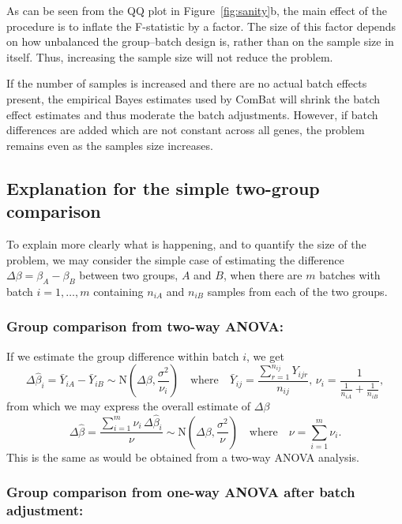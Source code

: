 \documentclass{bio}
\begin{document}
As can be seen from the QQ plot in Figure~\ref{fig:sanity}b, the main effect of the procedure is to inflate the F-statistic by a factor. The size of this factor depends on how unbalanced the group--batch design is, rather than on the sample size in itself. Thus, increasing the sample size will not reduce the problem.

If the number of samples is increased and there are no actual batch effects present, the empirical Bayes estimates used by ComBat will shrink the batch effect estimates and thus moderate the batch adjustments. However, if batch differences are added which are not constant across all genes, the problem remains even as the samples size increases.

\subsection{Explanation for the simple two-group comparison}
\label{sec:twogroups}

To explain more clearly what is happening, and to quantify the size of the problem, we may consider the simple case of estimating the difference $\Delta\beta=\beta_A-\beta_B$ between two groups, $A$ and $B$, when there are $m$ batches with batch $i=1,\ldots,m$ containing $n_{iA}$ and $n_{iB}$ samples from each of the two groups.

\subsubsection{Group comparison from two-way ANOVA:}

If we estimate the group difference within batch $i$, we get
\begin{equation}
\Delta\hat{\beta}_i=\bar{Y}_{iA}-\bar{Y}_{iB}\sim\text{N}\left(\Delta\beta,\frac{\sigma^2}{\nu_i}\right)
\quad\text{where}\quad
\bar{Y}_{ij}=\frac{\sum_{r=1}^{n_{ij}}Y_{ijr}}{n_{ij}},\,
\nu_i=\frac{1}{\frac{1}{n_{iA}}+\frac{1}{n_{iB}}},
\end{equation}
from which we may express the overall estimate of $\Delta\beta$
\begin{equation}
\Delta\hat{\beta}=\frac{\sum_{i=1}^m \nu_i\,\Delta\hat{\beta}_i}{\nu}
\sim\text{N}\left(\Delta\beta,\frac{\sigma^2}{\nu}\right)
\quad\text{where}\quad
\nu=\sum_{i=1}^m\nu_i.
\end{equation}
This is the same as would be obtained from a two-way ANOVA analysis.

\subsubsection{Group comparison from one-way ANOVA after batch adjustment:}
\end{document}
